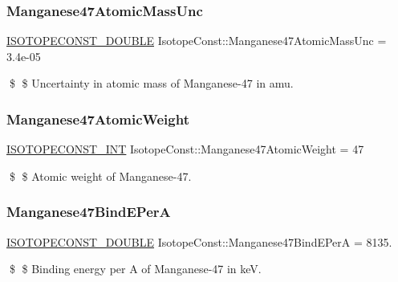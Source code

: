\subsubsection{\texorpdfstring{Manganese47\+Atomic\+Mass\+Unc}{Manganese47AtomicMassUnc}}
{\footnotesize\ttfamily \mbox{\hyperlink{group___isotope_const-_macros_ga8f45a7272ce02c0b4c65c44636ed719a}{I\+S\+O\+T\+O\+P\+E\+C\+O\+N\+S\+T\+\_\+\+D\+O\+U\+B\+LE}} Isotope\+Const\+::\+Manganese47\+Atomic\+Mass\+Unc = 3.\+4e-\/05}

\$ \$ Uncertainty in atomic mass of Manganese-\/47 in amu. \mbox{\label{group___isotope_const-_manganese-_mn47_ga741a8cfcdaf9ab27822b397b9abb3ef5}} 
\subsubsection{\texorpdfstring{Manganese47\+Atomic\+Weight}{Manganese47AtomicWeight}}
{\footnotesize\ttfamily \mbox{\hyperlink{group___isotope_const-_macros_ga5f18360b3e99483a35c32d789e62621c}{I\+S\+O\+T\+O\+P\+E\+C\+O\+N\+S\+T\+\_\+\+I\+NT}} Isotope\+Const\+::\+Manganese47\+Atomic\+Weight = 47}

\$ \$ Atomic weight of Manganese-\/47. \mbox{\label{group___isotope_const-_manganese-_mn47_ga18c318fc1da694136e99bc7be08f192c}} 
\subsubsection{\texorpdfstring{Manganese47\+Bind\+E\+PerA}{Manganese47BindEPerA}}
{\footnotesize\ttfamily \mbox{\hyperlink{group___isotope_const-_macros_ga8f45a7272ce02c0b4c65c44636ed719a}{I\+S\+O\+T\+O\+P\+E\+C\+O\+N\+S\+T\+\_\+\+D\+O\+U\+B\+LE}} Isotope\+Const\+::\+Manganese47\+Bind\+E\+PerA = 8135.}

\$ \$ Binding energy per A of Manganese-\/47 in keV. \mbox{\label{group___isotope_const-_manganese-_mn47_ga5a29bf1d357c430083267e0b0848a8ec}} 
